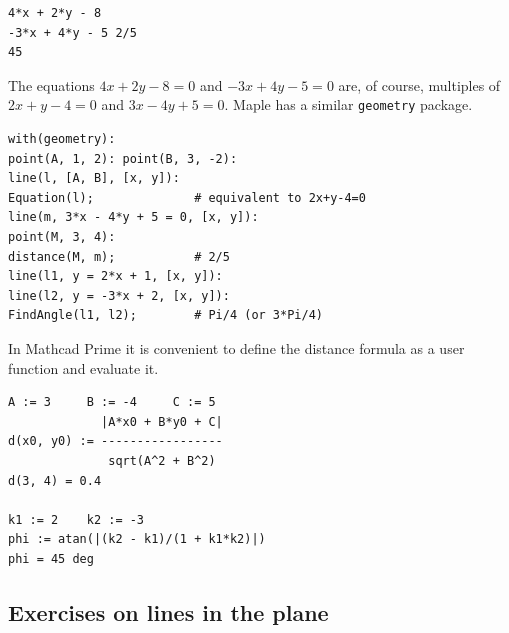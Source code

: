 \begin{Verbatim}[fontsize=\footnotesize,frame=single,label={\small Output}]
4*x + 2*y - 8
-3*x + 4*y - 5 2/5
45
\end{Verbatim}

\noindent The equations $4x+2y-8=0$ and $-3x+4y-5=0$ are, of course,
multiples of $2x+y-4=0$ and $3x-4y+5=0$. Maple has a similar
\texttt{geometry} package.

\begin{Verbatim}[fontsize=\footnotesize,frame=single,label={\small Maple}]
with(geometry):
point(A, 1, 2): point(B, 3, -2):
line(l, [A, B], [x, y]):
Equation(l);              # equivalent to 2x+y-4=0
line(m, 3*x - 4*y + 5 = 0, [x, y]):
point(M, 3, 4):
distance(M, m);           # 2/5
line(l1, y = 2*x + 1, [x, y]):
line(l2, y = -3*x + 2, [x, y]):
FindAngle(l1, l2);        # Pi/4 (or 3*Pi/4)
\end{Verbatim}

In Mathcad Prime it is convenient to define the distance formula as a
user function and evaluate it.

\begin{Verbatim}[fontsize=\footnotesize,frame=single,label={\small Mathcad}]
A := 3     B := -4     C := 5
             |A*x0 + B*y0 + C|
d(x0, y0) := -----------------
              sqrt(A^2 + B^2)
d(3, 4) = 0.4

k1 := 2    k2 := -3
phi := atan(|(k2 - k1)/(1 + k1*k2)|)
phi = 45 deg
\end{Verbatim}

\subsection{Exercises on lines in the plane}

